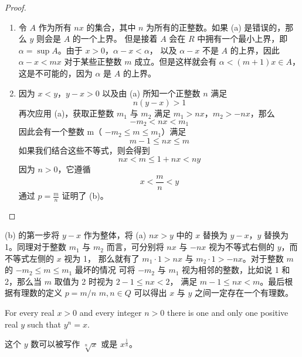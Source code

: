 \documentclass[../poma-notes.tex]{subfiles}
\begin{document}
\begin{proof}
  \begin{enumerate}[label=(\alph*)]
    \item 令 $A$ 作为所有 $nx$ 的集合，其中 $n$ 为所有的正整数。如果 (a) 是错误的，那么 $y$ 则会是 $A$ 的一个上界。
          但是接着 $A$ 会在 $R$ 中拥有一个最小上界，即 $\alpha  = \sup A$。由于 $x>0$，$\alpha - x < \alpha$，
          以及 $\alpha - x$ 不是 $A$ 的上界，因此 $\alpha - x < mx$ 对于某些正整数 $m$ 成立。但是这样就会有
          $\alpha < (m+1)x \in A$，这是不可能的，因为 $\alpha$ 是 $A$ 的上界。
    \item 因为 $x<y$，$y-x>0$ 以及由 (a) 所知一个正整数 $n$ 满足
          \[n(y-x)>1\]
          再次应用 (a)，获取正整数 $m_1$ 与 $m_2$ 满足 $m_1 > nx$，$m_2 > -nx$，那么
          \[-m_2 < nx < m_1\]
          因此会有一个整数 m（ $-m_2 \le m \le m_1$）满足
          \[m-1 \le nx \le m\]
          如果我们结合这些不等式，则会得到
          \[nx < m \le 1 + nx < ny\]
          因为 $n>0$，它遵循
          \[x < \frac{m}{n} < y\]
          通过 $p=\frac{m}{n}$ 证明了 (b)。
  \end{enumerate}
\end{proof}

\begin{anote}
  (b) 的第一步将 $y-x$ 作为整体，将 (a) $nx > y$ 中的 $x$ 替换为 $y-x$，$y$ 替换为 1。同理对于整数
  $m_1$ 与 $m_2$ 而言，可分别将 $nx$ 与 $-nx$ 视为不等式右侧的 $y$，而不等式左侧的 $x$ 视为 1，
  那么就有了 $m_1 \cdot 1 > nx$ 与 $m_2 \cdot 1 > -nx$。对于整数 $m$ 的 $-m_2 \le m \le m_1$ 最坏的情况
  可将 $-m_2$ 与 $m_1$ 视为相邻的整数，比如说 1 和 2，那么当 $m$ 取值为 2 时视为 $2 - 1 \le nx < 2$，
  满足 $m - 1 \le nx < m$。最后根据有理数的定义 $p=m/n$ $m,n \in Q$ 可以得出 $x$ 与 $y$ 之间一定存在一个有理数。
\end{anote}

\begin{theorem}
  For every real $x>0$ and every integer $n>0$ there is one and only one positive real $y$ such that
  $y^n=x$.
\end{theorem}

这个 $y$ 数可以被写作 $\sqrt[n]{x}$ 或是 $x^\frac{1}{n}$。
\end{document}
